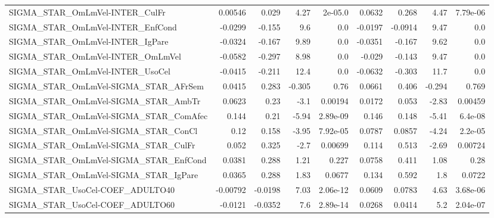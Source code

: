 \begin{tabular}{lrrrrrrrr}
SIGMA\_STAR\_OmLmVel-INTER\_CulFr        &     0.00546 &        0.029 &     4.27 &  2e-05.0 &     0.0632 &       0.268 &         4.47 &      7.79e-06 \\
SIGMA\_STAR\_OmLmVel-INTER\_EnfCond      &     -0.0299 &       -0.155 &      9.6 &      0.0 &    -0.0197 &     -0.0914 &         9.47 &           0.0 \\
SIGMA\_STAR\_OmLmVel-INTER\_IgPare       &     -0.0324 &       -0.167 &     9.89 &      0.0 &    -0.0351 &      -0.167 &         9.62 &           0.0 \\
SIGMA\_STAR\_OmLmVel-INTER\_OmLmVel      &     -0.0582 &       -0.297 &     8.98 &      0.0 &     -0.029 &      -0.143 &         9.47 &           0.0 \\
SIGMA\_STAR\_OmLmVel-INTER\_UsoCel       &     -0.0415 &       -0.211 &     12.4 &      0.0 &    -0.0632 &      -0.303 &         11.7 &           0.0 \\
SIGMA\_STAR\_OmLmVel-SIGMA\_STAR\_AFrSem  &      0.0415 &        0.283 &   -0.305 &     0.76 &     0.0661 &       0.406 &       -0.294 &         0.769 \\
SIGMA\_STAR\_OmLmVel-SIGMA\_STAR\_AmbTr   &      0.0623 &         0.23 &     -3.1 &  0.00194 &     0.0172 &       0.053 &        -2.83 &       0.00459 \\
SIGMA\_STAR\_OmLmVel-SIGMA\_STAR\_ComAfec &       0.144 &         0.21 &    -5.94 & 2.89e-09 &      0.146 &       0.148 &        -5.41 &       6.4e-08 \\
SIGMA\_STAR\_OmLmVel-SIGMA\_STAR\_ConCl   &        0.12 &        0.158 &    -3.95 & 7.92e-05 &     0.0787 &      0.0857 &        -4.24 &       2.2e-05 \\
SIGMA\_STAR\_OmLmVel-SIGMA\_STAR\_CulFr   &       0.052 &        0.325 &     -2.7 &  0.00699 &      0.114 &       0.513 &        -2.69 &       0.00724 \\
SIGMA\_STAR\_OmLmVel-SIGMA\_STAR\_EnfCond &      0.0381 &        0.288 &     1.21 &    0.227 &     0.0758 &       0.411 &         1.08 &          0.28 \\
SIGMA\_STAR\_OmLmVel-SIGMA\_STAR\_IgPare  &      0.0365 &        0.288 &     1.83 &   0.0677 &      0.134 &       0.592 &          1.8 &        0.0722 \\
SIGMA\_STAR\_UsoCel-COEF\_ADULTO40       &    -0.00792 &      -0.0198 &     7.03 & 2.06e-12 &     0.0609 &      0.0783 &         4.63 &      3.68e-06 \\
SIGMA\_STAR\_UsoCel-COEF\_ADULTO60       &     -0.0121 &      -0.0352 &      7.6 & 2.89e-14 &     0.0268 &      0.0414 &          5.2 &      2.04e-07 \\

\end{tabular}
